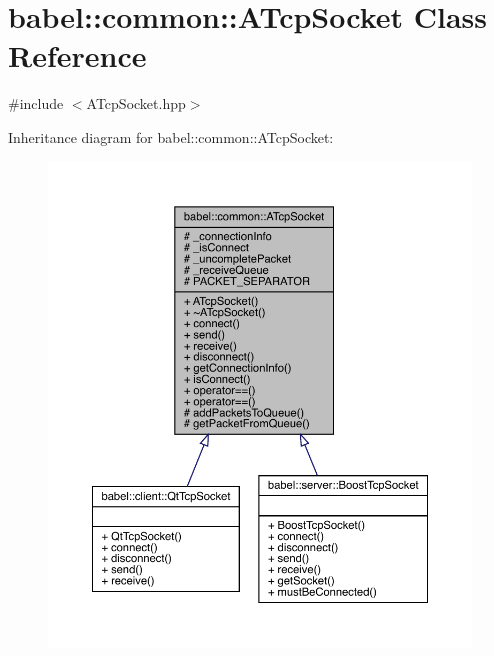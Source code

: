 \hypertarget{classbabel_1_1common_1_1_a_tcp_socket}{}\section{babel\+:\+:common\+:\+:A\+Tcp\+Socket Class Reference}
\label{classbabel_1_1common_1_1_a_tcp_socket}


{\ttfamily \#include $<$A\+Tcp\+Socket.\+hpp$>$}



Inheritance diagram for babel\+:\+:common\+:\+:A\+Tcp\+Socket\+:\nopagebreak
\begin{figure}[H]
\begin{center}
\leavevmode
\includegraphics[width=350pt]{classbabel_1_1common_1_1_a_tcp_socket__inherit__graph}
\end{center}
\end{figure}



